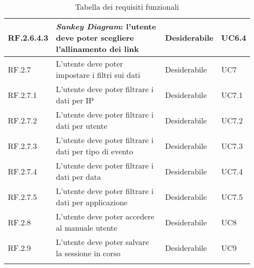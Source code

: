 \begin{center}
\begin{longtable}{|L{1,5cm}|C{5,5cm}|C{3cm}|C{2cm}|}
    RF.2.6.4.3 & \textit{Sankey Diagram}: l'utente deve poter scegliere l'allinamento dei link & Desiderabile & UC6.4 \\ \hline
    RF.2.7 & L'utente deve poter impostare i filtri sui dati & Desiderabile & UC7 \\ \hline
    RF.2.7.1 & L'utente deve poter filtrare i dati per IP & Desiderabile & UC7.1 \\ \hline
    RF.2.7.2 & L'utente deve poter filtrare i dati per utente & Desiderabile & UC7.2 \\ \hline
    RF.2.7.3 & L'utente deve poter filtrare i dati per tipo di evento & Desiderabile & UC7.3 \\ \hline
    RF.2.7.4 & L'utente deve poter filtrare i dati per data & Desiderabile & UC7.4 \\ \hline
    RF.2.7.5 & L'utente deve poter filtrare i dati per applicazione & Desiderabile & UC7.5 \\ \hline
    RF.2.8 & L'utente deve poter accedere al manuale utente & Desiderabile & UC8 \\ \hline
    RF.2.9 & L'utente deve poter salvare la sessione in corso & Desiderabile & UC9 \\ \hline

    \caption{Tabella dei requisiti funzionali}
  \end{longtable}
\end{center}


